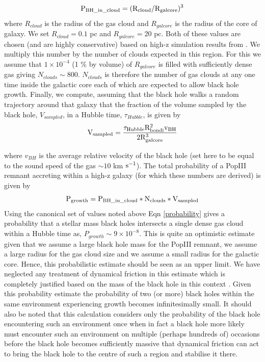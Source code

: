 \documentclass[twocolumn, tighten]{aastex631}
\newcommand{\kms} {km $\rm{s^{-1}}$}
\def\majo#1{{\color{brown} \bf MJ:  #1}}
\begin{document}
\begin{equation}
\rm{P_{BH\_in\_cloud} = (R_{cloud}/R_{galcore})^3}
\end{equation}
where $R_{cloud}$ is the radius of the gas cloud and $R_{galcore}$ is the radius of the core of galaxy. We set $R_{cloud} = 0.1$ pc and $R_{galcore} = 20$ pc. Both of 
these values are chosen (and are highly conservative) based on high-z simulation results from \cite{Regan_2020b}. We multiply this number by the number of clouds expected in this region. For this we assume that $1 \times 10^{-4}$ (1 \% by volume) of  $R_{galcore}$ is filled with sufficiently dense gas giving $N_{clouds} \sim 800$. $N_{clouds}$ is therefore the number of gas clouds at any one time inside the galactic core each of which are expected to 
allow black hole growth. Finally, we compute, assuming that the 
black hole walks a random trajectory around that galaxy that the fraction of the volume sampled by the black hole, $V_{sampled}$, in a Hubble time, $\tau_{Hubble}$, is given by 
\begin{equation}
    \rm{V_{\rm{sampled}} = {{\tau_{Hubble} R_{bondi}^2 v_{BH}} \over {2 R_{galcore}^3}}}
\end{equation}

where $v_{BH}$ is the average relative velocity of the black hole (set here to be equal to the sound speed of the gas $\sim 10$ \kms). The total probability of a PopIII remnant accreting within a high-z galaxy (for which these numbers are derived) is given by
\begin{equation} \label{probability}
    \rm{P_{growth} = P_{BH\_in\_cloud} * N_{clouds} * V_{sampled}}
\end{equation}
 Using the canonical set of values noted above Eqn \ref{probability} gives a probability that a 
 stellar mass black holes intersects a single dense gas cloud within a Hubble time as, $P_{growth} \sim 9 \times 10^{-8}$.
 This is quite an optimistic
 estimate given that we assume a large black hole mass for the PopIII remnant, we assume a large radius for the gas cloud size and we assume a small radius for the galactic core. Hence, this probabilistic estimate should be seen as an upper limit. We have neglected any treatment of dynamical friction in this estimate which is completely justified based on the mass of the black hole in this context \citep{Binney_1987}. Given this probability estimate the probability of two (or more) black holes within the same environment experiencing growth becomes infinitesimally small. It should also be noted that this calculation considers only the probability of the black hole encountering such an environment once when in fact a black hole more likely must encounter such an environment on multiple (perhaps hundreds of) occasions before the black hole becomes sufficiently massive that dynamical friction can act to bring the black hole to the centre of such a region and stabilise it there. \\
\end{document}
